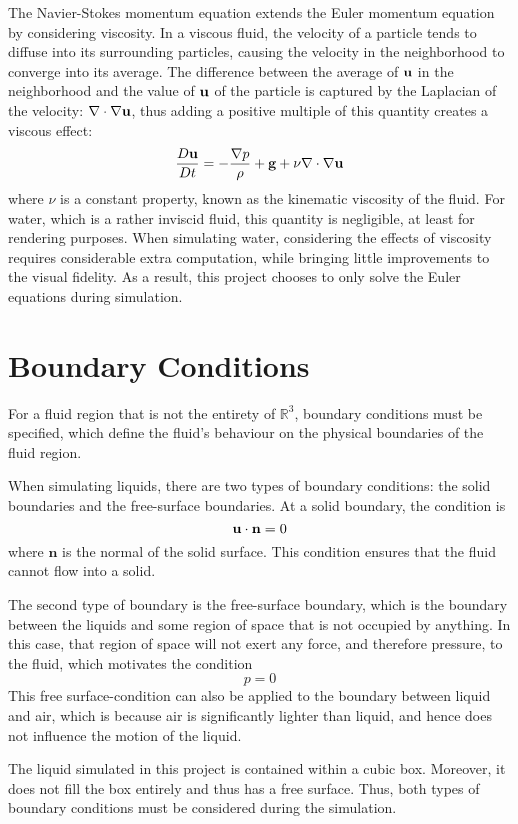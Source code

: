 The Navier-Stokes momentum equation extends the Euler momentum equation by considering viscosity. In a viscous fluid, the velocity of a particle tends to diffuse into its surrounding particles, causing the velocity in the neighborhood to converge into its average. The difference between the average of $\textbf{u}$ in the neighborhood and the value of $\textbf{u}$ of the particle is captured by the Laplacian of the velocity: $\nabla \cdot \nabla \textbf{u}$, thus adding a positive multiple of this quantity creates a viscous effect:
$$
\frac{D\textbf{u}}{Dt}   =   -\frac{\nabla p}{\rho} + \textbf{g} + \nu \nabla \cdot \nabla \textbf{u} 
$$
where $\nu$ is a constant property, known as the kinematic viscosity of the fluid. For water, which is a rather inviscid fluid, this quantity is negligible, at least for rendering purposes. When simulating water, considering the effects of viscosity requires considerable extra computation, while bringing little improvements to the visual fidelity. As a result, this project chooses to only solve the Euler equations during simulation. 


\section{Boundary Conditions}
\label{section boundary conditions}
For a fluid region that is not the entirety of $\mathbb{R}^3$, boundary conditions must be specified, which define the fluid's behaviour on the physical boundaries of the fluid region.

When simulating liquids, there are two types of boundary conditions: the solid boundaries and the free-surface boundaries. At a solid boundary, the condition is 
$$
    \textbf{u} \cdot \textbf{n} = 0
$$
where $\textbf{n}$ is the normal of the solid surface. This condition ensures that the fluid cannot flow into a solid. 

The second type of boundary is the free-surface boundary, which is the boundary between the liquids and some region of space that is not occupied by anything. In this case, that region of space will not exert any force, and therefore pressure, to the fluid, which motivates the condition
$$
p = 0
$$
This free surface-condition can also be applied to the boundary between liquid and air, which is because air is significantly lighter than liquid, and hence does not influence the motion of the liquid.

The liquid simulated in this project is contained within a cubic box. Moreover, it does not fill the box entirely and thus has a free surface. Thus, both types of boundary conditions must be considered during the simulation. 

